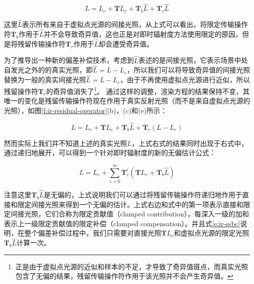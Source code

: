 \begin{equation}
	L=L_e+\mathbf{T}L_e+\mathbf{T}_b\hat{L}+\mathbf{T}_r\hat{L}
\end{equation}

\noindent 这里$\hat{L}$表示所有来自于虚拟点光源的间接光照，从上式可以看出，将限定传输操作符$\mathbf{T}_b$作用于$\hat{L}$并不会导致奇异值，这也正是对即时辐射度方法使用限定的原因，但是将残留传输操作符$\mathbf{T}_r$作用于$\hat{L}$却会遭受奇异值。

为了推导出一种新的偏差补偿技术，考虑到$\hat{L}$表述的是间接光照，它表示场景中处自发光之外的的真实光照，即$\hat{L}=L-L_e$，所以我们可以将导致奇异值的间接光照替换为一般的真实间接光照$\hat{L}=L-L_e$，由于不再使用虚拟点光源进行近似，所以残留操作符$\mathbf{T}_r$的奇异值消失了\footnote{正是由于虚拟点光源的近似和样本的不足，才导致了奇异值斑点，而真实光照包含了无偏的结果，残留传输操作符作用于该光照并不会产生奇异值。}。 通过这样的调整，渲染方程的结果保持不变，其唯一的变化是残留传输操作符现在作用于真实反射光照（而不是来自虚拟点光源的光照），如图\ref{f:ir-residual-operator}(b)，(c)和(e)所示：

\begin{equation}
	L=L_e+\mathbf{T}L_e+\mathbf{T}_b\hat{L}+\mathbf{T}_r(L-L_e)
\end{equation}

\noindent 然而实际上我们并不知道上述的真实光照$L$，上式右式的结果同时出现于右式中，通过递归地展开，可以得到一个针对即时辐射度的新的无偏估计公式：

\begin{equation}\label{e:ir-ssbc}
	L=L_e+\sum^{\infty}_{i=0}\mathbf{T}^{i}_r(\mathbf{T}L_e+\mathbf{T}_b\hat{L})
\end{equation}

\noindent 注意这里$\mathbf{T}_b\hat{L}$是无偏的，上式说明我们可以通过将残留传输操作符递归地作用于直接和限定间接光照来得到一个无偏的估计。上式右边和式中的第一项表示直接和限定间接光照，它们合称为限定贡献值（clamped contribution），每深入一级的加和表示上一级限定贡献值的限定补偿（clamped compensation）。并且式\ref{e:ir-ssbc}说明，在整个偏差补偿过程中，我们只需要对直接光照$\mathbf{T}L_e$和虚拟点光源的限定光照$\mathbf{T}_b\hat{L}$计算一次。

